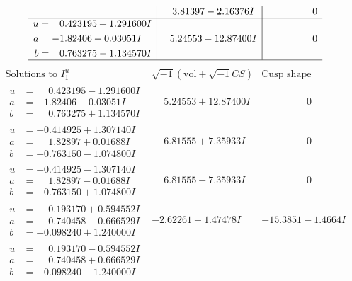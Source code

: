 \documentclass[1p]{elsarticle_modified}
\theoremstyle{definition}
\newcommand{\I}{\sqrt{-1}}
\begin{document}
$$\begin{array}{c|c|c}
 & \phantom{-}3.81397 - 2.16376 I & \phantom{-0.000000 } 0 \\ \hline\begin{aligned}
u &= \phantom{-}0.423195 + 1.291600 I \\
a &= -1.82406 + 0.03051 I \\
b &= \phantom{-}0.763275 - 1.134570 I\end{aligned}
 & \phantom{-}5.24553 - 12.87400 I & \phantom{-0.000000 } 0\\
 \hline 
 \end{array}$$\newpage$$\begin{array}{c|c|c}  
\text{Solutions to }I^u_{1}& \I (\text{vol} + \sqrt{-1}CS) & \text{Cusp shape}\\
 \hline 
\begin{aligned}
u &= \phantom{-}0.423195 - 1.291600 I \\
a &= -1.82406 - 0.03051 I \\
b &= \phantom{-}0.763275 + 1.134570 I\end{aligned}
 & \phantom{-}5.24553 + 12.87400 I & \phantom{-0.000000 } 0 \\ \hline\begin{aligned}
u &= -0.414925 + 1.307140 I \\
a &= \phantom{-}1.82897 + 0.01688 I \\
b &= -0.763150 - 1.074800 I\end{aligned}
 & \phantom{-}6.81555 + 7.35933 I & \phantom{-0.000000 } 0 \\ \hline\begin{aligned}
u &= -0.414925 - 1.307140 I \\
a &= \phantom{-}1.82897 - 0.01688 I \\
b &= -0.763150 + 1.074800 I\end{aligned}
 & \phantom{-}6.81555 - 7.35933 I & \phantom{-0.000000 } 0 \\ \hline\begin{aligned}
u &= \phantom{-}0.193170 + 0.594552 I \\
a &= \phantom{-}0.740458 - 0.666529 I \\
b &= -0.098240 + 1.240000 I\end{aligned}
 & -2.62261 + 1.47478 I & -15.3851 - 1.4664 I \\ \hline\begin{aligned}
u &= \phantom{-}0.193170 - 0.594552 I \\
a &= \phantom{-}0.740458 + 0.666529 I \\
b &= -0.098240 - 1.240000 I\end{aligned}

\end{array}$$
\end{document}

